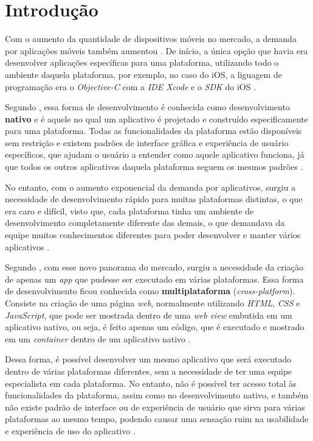 \chapter{Introdução} \label{cap:introducao}

Com o aumento da quantidade de dispositivos móveis no mercado, a demanda por aplicações móveis também aumentou \cite{cevallos_case_2014}.
De início, a única opção que havia era desenvolver aplicações específicas para uma plataforma, utilizando todo o ambiente daquela plataforma, por exemplo,
no caso do iOS, a liguagem de programação era o \textit{Objective-C} com a \textit{IDE Xcode} e o \textit{SDK} do iOS \cite{heitkotter_comparing_2013}.

Segundo , essa forma de desenvolvimento é conhecida como desenvolvimento \textbf{nativo} e é aquele no qual um aplicativo é projetado e construído especificamente para uma plataforma. 
Todas as funcionalidades da plataforma estão disponíveis sem restrição e existem padrões de interface gráfica e experiência de usuário específicos, que ajudam o usuário a 
entender como aquele aplicativo funciona, já que todos os outros aplicativos daquela plataforma seguem os mesmos padrões \cite{corral_ant_2012}. 

No entanto, com o aumento exponencial da demanda por aplicativos, surgiu a necessidade de desenvolvimento rápido para muitas plataformas distintas, o que era caro e difícil,
visto que, cada plataforma tinha um ambiente de desenvolvimento completamente diferente das demais, o que demandava da equipe muitos conhecimentos diferentes
para poder desenvolver e manter vários aplicativos \cite{prezotto_estudo_2014}.

Segundo , com esse novo panorama do mercado, surgiu a necessidade da criação de apenas um \textit{app} que pudesse ser executado 
em várias plataformas. Essa forma de desenvolvimento ficou conhecida como \textbf{multiplataforma} (\textit{cross-platform}). 
Consiste na criação de uma página \textit{web}, normalmente utilizando \textit{HTML}, \textit{CSS} e \textit{JavaScript}, que pode ser mostrada dentro de uma \textit{web view} 
embutida em um aplicativo nativo, ou seja, é feito apenas um código, que é executado e mostrado em um \textit{container} dentro de um aplicativo nativo \cite{stark_building_2010, heitkotter_comparing_2013}. 

Dessa forma, é possível desenvolver um mesmo aplicativo que será executado dentro de várias plataformas diferentes, sem a necessidade de ter uma equipe especialista em cada plataforma.
No entanto, não é possível ter acesso total às funcionalidades da plataforma, assim como no desenvolvimento nativo, e também não existe padrão de interface ou de experiência de usuário que sirva
para várias plataformas ao mesmo tempo, podendo causar uma sensação ruim na usabilidade e experiência de uso do aplicativo \cite{corral_ant_2012}.

